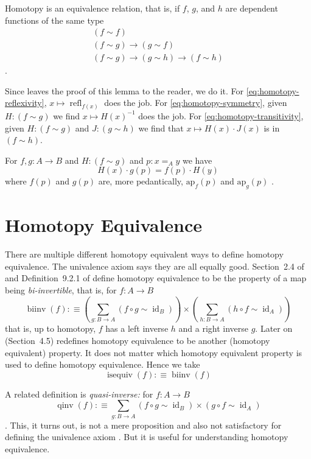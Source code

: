 \documentclass[11pt]{article}
\DeclareMathOperator{\idfun}{id}
\DeclareMathOperator{\refl}{refl}
\DeclareMathOperator{\biinv}{biinv}
\DeclareMathOperator{\qinv}{qinv}
\DeclareMathOperator{\isequiv}{isequiv}
\begin{document}
Homotopy is an equivalence relation, that is, if $f$, $g$, and $h$
are dependent functions of the same type
\begin{subequations}
\begin{gather}
   (f \sim f)
   \label{eq:homotopy-reflexivity}
   \\
   (f \sim g) \to (g \sim f)
   \label{eq:homotopy-symmetry}
   \\
   (f \sim g) \to (g \sim h) \to (f \sim h)
   \label{eq:homotopy-transitivity}
\end{gather}
\end{subequations}
.

Since \citet{hott-book} leaves the proof of this lemma to the reader,
we do it.  For \eqref{eq:homotopy-reflexivity}, $x \mapsto \refl_{f(x)}$
does the job.  For \eqref{eq:homotopy-symmetry}, given $H : (f \sim g)$
we find $x \mapsto H(x)^{-1}$ does the job.
For \eqref{eq:homotopy-transitivity}, given $H : (f \sim g)$ and
$J : (g \sim h)$ we find that $x \mapsto H(x) \cdot J(x)$ is in $(f \sim h)$.

For $f, g : A \to B$ and $H : (f \sim g)$ and $p : x =_A y$ we have
$$
   H(x) \cdot g(p) = f(p) \cdot H(y)
$$
where $f(p)$ and $g(p)$ are, more pedantically,
$\text{ap}_f(p)$ and $\text{ap}_g(p)$
.

\section{Homotopy Equivalence}

There are multiple different homotopy equivalent ways to define homotopy
equivalence.  The univalence axiom says they are
all equally good.  Section~2.4 of  and Definition~9.2.1
of \citet{rijke} define homotopy equivalence to be the property of a map
being \emph{bi-invertible}, that is, for $f : A \to B$
$$
   \biinv(f) :\equiv
   \left( \sum_{g : B \to A} (f \circ g \sim \idfun_B) \right)
   \times
   \left( \sum_{h : B \to A} (h \circ f \sim \idfun_A) \right)
$$
that is, up to homotopy, $f$ has a left inverse $h$ and a right inverse $g$.
Later on (Section~4.5)  redefines homotopy equivalence
to be another (homotopy equivalent) property.  It does not matter which
homotopy equivalent property is used to define homotopy equivalence.
Hence we take
$$
   \isequiv(f) :\equiv \biinv(f)
$$

A related definition is \emph{quasi-inverse:} for $f : A \to B$
$$
   \qinv(f) :\equiv \sum_{g : B \to A}
   (f \circ g \sim \idfun_B) \times (g \circ f \sim \idfun_A)
$$
.
This, it turns out, is not a mere proposition
 and also not satisfactory for
defining the univalence axiom
.
But it is useful for understanding homotopy equivalence.
\end{document}
